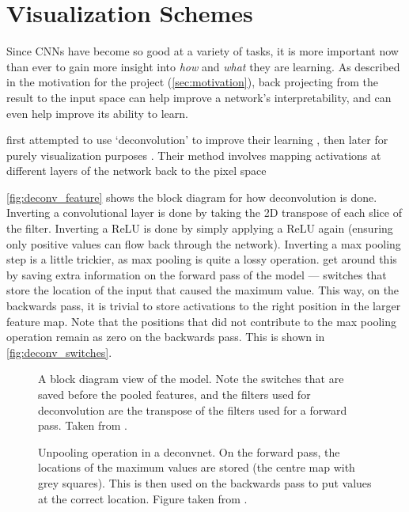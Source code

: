\section{Visualization Schemes}\label{sec:visualization_schemes}
  Since CNNs have become so good at a variety of tasks, it is more important
  now than ever to gain more insight into \emph{how} and \emph{what} they are
  learning. As described in the motivation for the project
  (\autoref{sec:motivation}), back projecting from the result to the input space
  can help improve a network's interpretability, and can even help improve its
  ability to learn. 

  \citeauthor{zeiler_adaptive_2011} first attempted to use `deconvolution' to
  improve their learning \citep{zeiler_adaptive_2011}, then later for purely
  visualization purposes \citep{zeiler_visualizing_2014}. Their method
  involves mapping activations at different layers of the network back to the pixel
  space
  
  \autoref{fig:deconv_feature} shows the block diagram for how deconvolution is
  done. Inverting a convolutional layer is done by taking the 2D transpose of each
  slice of the filter. Inverting a ReLU is done by simply applying a ReLU again
  (ensuring only positive values can flow back through the network). Inverting
  a max pooling step is a little trickier, as max pooling is quite a lossy
  operation. \citeauthor{zeiler_adaptive_2011} get around this by saving extra
  information on the forward pass of the model --- switches that store the
  location of the input that caused the maximum value. This way, on the
  backwards pass, it is trivial to store activations to the right position in
  the larger feature map. Note that the positions that did not contribute to
  the max pooling operation remain as zero on the backwards pass. This is shown
  in \autoref{fig:deconv_switches}.

  \begin{figure}
    \centering
      \caption[Deconvolution Network Block Diagram]
              {A block diagram view of the model. Note the switches that
              are saved before the pooled features, and the filters
              used for deconvolution are the transpose of the filters used for
              a forward pass. Taken from
              \citep{zeiler_visualizing_2014}.}
      \label{fig:deconv_feature}
  \end{figure}

  \begin{figure}
    \centering
      \caption[Unpooling operation in a deconvnet]
              {Unpooling operation in a deconvnet. On the forward pass, the
              locations of the maximum values are stored (the centre map with
              grey squares). This is then used on the backwards pass to put
              values at the correct location. Figure taken from \citep{zeiler_visualizing_2014}.}
      \label{fig:deconv_switches}
  \end{figure}
  
